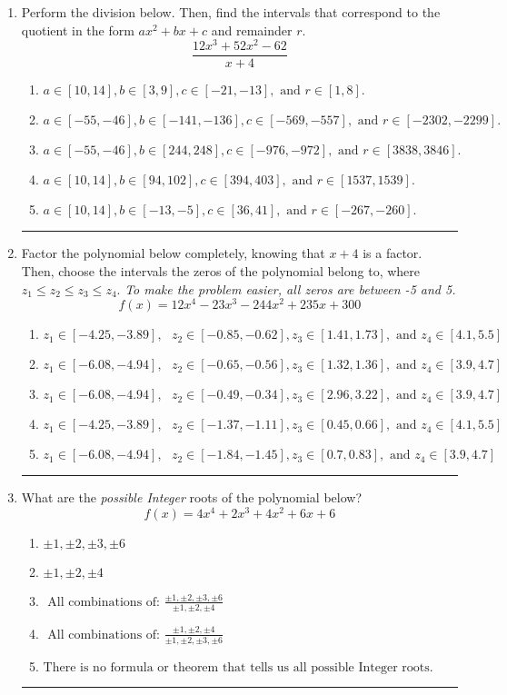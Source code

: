 \documentclass[14pt]{extbook}
\newcommand{\litem}[1]{\item#1\hspace*{-1cm}\rule{\textwidth}{0.4pt}}
\begin{document}
\begin{enumerate}
{\begin{enumerate}[label=\Alph*.]
\end{enumerate} }
\litem{
Perform the division below. Then, find the intervals that correspond to the quotient in the form $ax^2+bx+c$ and remainder $r$.\[ \frac{12x^{3} +52 x^{2} -62}{x + 4} \]\begin{enumerate}[label=\Alph*.]
\item \( a \in [10, 14], b \in [3, 9], c \in [-21, -13], \text{ and } r \in [1, 8]. \)
\item \( a \in [-55, -46], b \in [-141, -136], c \in [-569, -557], \text{ and } r \in [-2302, -2299]. \)
\item \( a \in [-55, -46], b \in [244, 248], c \in [-976, -972], \text{ and } r \in [3838, 3846]. \)
\item \( a \in [10, 14], b \in [94, 102], c \in [394, 403], \text{ and } r \in [1537, 1539]. \)
\item \( a \in [10, 14], b \in [-13, -5], c \in [36, 41], \text{ and } r \in [-267, -260]. \)

\end{enumerate} }
\litem{
Factor the polynomial below completely, knowing that $x + 4$ is a factor. Then, choose the intervals the zeros of the polynomial belong to, where $z_1 \leq z_2 \leq z_3 \leq z_4$. \textit{To make the problem easier, all zeros are between -5 and 5.}\[ f(x) = 12x^{4} -23 x^{3} -244 x^{2} +235 x + 300 \]\begin{enumerate}[label=\Alph*.]
\item \( z_1 \in [-4.25, -3.89], \text{   }  z_2 \in [-0.85, -0.62], z_3 \in [1.41, 1.73], \text{   and   } z_4 \in [4.1, 5.5] \)
\item \( z_1 \in [-6.08, -4.94], \text{   }  z_2 \in [-0.65, -0.56], z_3 \in [1.32, 1.36], \text{   and   } z_4 \in [3.9, 4.7] \)
\item \( z_1 \in [-6.08, -4.94], \text{   }  z_2 \in [-0.49, -0.34], z_3 \in [2.96, 3.22], \text{   and   } z_4 \in [3.9, 4.7] \)
\item \( z_1 \in [-4.25, -3.89], \text{   }  z_2 \in [-1.37, -1.11], z_3 \in [0.45, 0.66], \text{   and   } z_4 \in [4.1, 5.5] \)
\item \( z_1 \in [-6.08, -4.94], \text{   }  z_2 \in [-1.84, -1.45], z_3 \in [0.7, 0.83], \text{   and   } z_4 \in [3.9, 4.7] \)

\end{enumerate} }
\litem{
What are the \textit{possible Integer} roots of the polynomial below?\[ f(x) = 4x^{4} +2 x^{3} +4 x^{2} +6 x + 6 \]\begin{enumerate}[label=\Alph*.]
\item \( \pm 1,\pm 2,\pm 3,\pm 6 \)
\item \( \pm 1,\pm 2,\pm 4 \)
\item \( \text{ All combinations of: }\frac{\pm 1,\pm 2,\pm 3,\pm 6}{\pm 1,\pm 2,\pm 4} \)
\item \( \text{ All combinations of: }\frac{\pm 1,\pm 2,\pm 4}{\pm 1,\pm 2,\pm 3,\pm 6} \)
\item \( \text{There is no formula or theorem that tells us all possible Integer roots.} \)


\end{enumerate}}
\end{enumerate}
\end{document}
